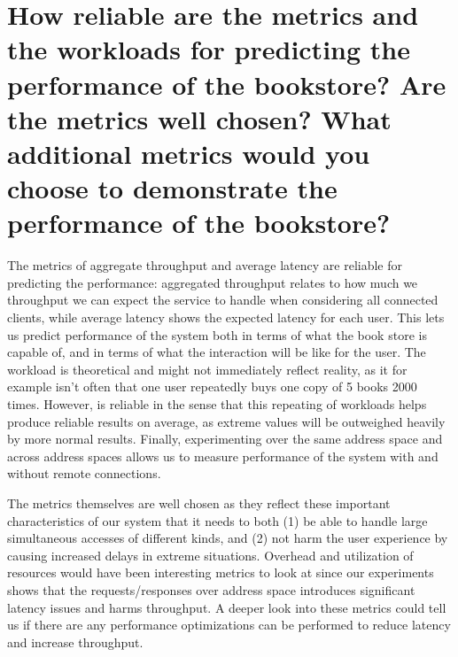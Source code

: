 \documentclass{article}
\begin{document}
\section{How reliable are the metrics and the workloads for predicting the performance of the bookstore? Are the metrics well chosen? What additional metrics would you choose to demonstrate the performance of the bookstore?}

The metrics of aggregate throughput and average latency are reliable for predicting the performance: aggregated throughput relates to how much we throughput we can expect the service to handle when considering all connected clients, while average latency shows the expected latency for each user. This lets us predict performance of the system both in terms of what the book store is capable of, and in terms of what the interaction will be like for the user. The workload is theoretical and might not immediately reflect reality, as it for example isn't often that one user repeatedly buys one copy of 5 books 2000 times. However, is reliable in the sense that this repeating of workloads helps produce reliable results on average, as extreme values will be outweighed heavily by more normal results. Finally, experimenting over the same address space and across address spaces allows us to measure performance of the system with and without remote connections.

The metrics themselves are well chosen as they reflect these important characteristics of our system that it needs to both (1) be able to handle large simultaneous accesses of different kinds, and (2) not harm the user experience by causing increased delays in extreme situations. Overhead and utilization of resources would have been interesting metrics to look at since our experiments shows that the requests/responses over address space introduces significant latency issues and harms throughput. A deeper look into these metrics could tell us if there are any performance optimizations can be performed to reduce latency and increase throughput.
\end{document}
